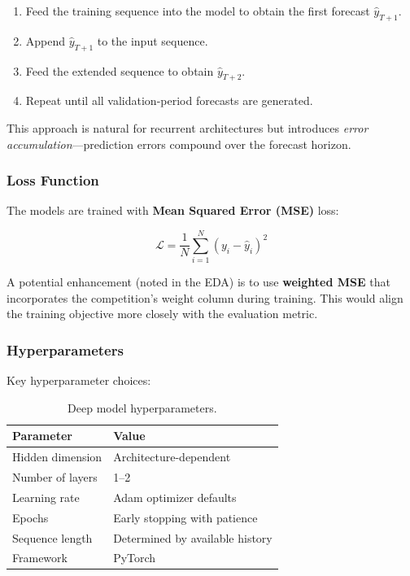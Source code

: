 \begin{enumerate}
    \item Feed the training sequence into the model to obtain the first forecast $\hat{y}_{T+1}$.
    \item Append $\hat{y}_{T+1}$ to the input sequence.
    \item Feed the extended sequence to obtain $\hat{y}_{T+2}$.
    \item Repeat until all validation-period forecasts are generated.
\end{enumerate}

This approach is natural for recurrent architectures but introduces \emph{error accumulation}---prediction errors compound over the forecast horizon.

\subsubsection{Loss Function}

The models are trained with \textbf{Mean Squared Error (MSE)} loss:

\begin{equation}
\mathcal{L} = \frac{1}{N} \sum_{i=1}^{N} (y_i - \hat{y}_i)^2
\end{equation}

A potential enhancement (noted in the EDA) is to use \textbf{weighted MSE} that incorporates the competition's weight column during training. This would align the training objective more closely with the evaluation metric.

\subsubsection{Hyperparameters}

Key hyperparameter choices:

\begin{table}[H]
\centering
\caption{Deep model hyperparameters.}
\begin{tabular}{ll}
\toprule
\textbf{Parameter} & \textbf{Value} \\
\midrule
Hidden dimension & Architecture-dependent \\
Number of layers & 1--2 \\
Learning rate & Adam optimizer defaults \\
Epochs & Early stopping with patience \\
Sequence length & Determined by available history \\
Framework & PyTorch \\
\bottomrule
\end{tabular}
\end{table}


